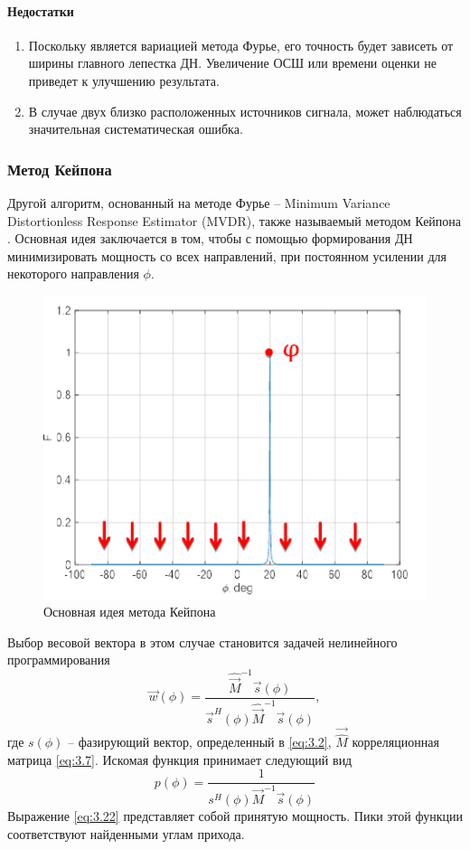 \paragraph{Недостатки}%
\label{par:nedostatki}
\begin{enumerate}
    \item Поскольку является вариацией метода Фурье, его точность будет зависеть 
    от ширины главного лепестка ДН. Увеличение ОСШ или времени оценки не приведет к улучшению результата. 
    \item В случае двух близко расположенных источников сигнала, может наблюдаться значительная систематическая ошибка. 
\end{enumerate}

\subsubsection{Метод Кейпона}%
\label{sub:minimum_variance_distortionless_response_estimator_capon_method_}
\label{sec:Capon}

Другой алгоритм, основанный на методе Фурье -- Minimum Variance
Distortionless Response Estimator (MVDR), также называемый методом Кейпона \cite{Stoica2005,Allen2006, Godara2004}. 
Основная идея заключается в том, чтобы с помощью формирования ДН 
минимизировать мощность со всех направлений, при постоянном усилении для некоторого направления $\phi$.

\begin{figure}[h]
    \centering
    \includegraphics[width=0.6\linewidth]{figs/fig3.15.png}
    \caption{Основная идея метода Кейпона}
    \label{fig:3.15}
\end{figure}
Выбор весовой вектора в этом случае становится задачей нелинейного программирования 
\cite{Stoica2005, Godara2004}
\begin{equation}
    \label{eq:3.21}
    \vec w(\phi) = \frac{\hat{\vec M}^{-1} \vec s (\phi)}{\vec s^H(\phi)
        \hat{\vec M}^{-1} \vec s(\phi)},
\end{equation}
где $s(\phi)$ -- фазирующий вектор, определенный в \eqref{eq:3.2}, $\vec{\hat M}$ корреляционная матрица \eqref{eq:3.7}.
Искомая функция принимает следующий вид
\begin{equation}
    \label{eq:3.22}
    p(\phi) = \frac{1}{s^H(\phi) \vec M^{-1} \vec s(\phi)}
\end{equation}
Выражение \eqref{eq:3.22} представляет собой принятую мощность. Пики этой функции соответствуют найденными углам прихода. 
